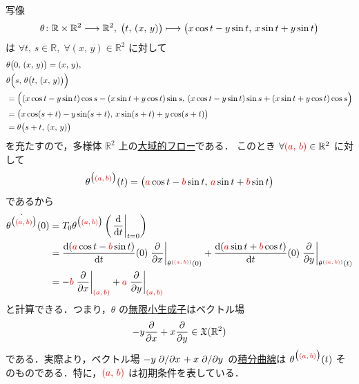 \documentclass[TQFT_main]{subfiles}
\begin{document}
\begin{myexample}[]{}
    \cinfty 写像
    \begin{align}
        \theta \colon \mathbb{R} \times \mathbb{R}^2 \longrightarrow \mathbb{R}^2,\; \bigl( t,\, (x,\, y) \bigr) \longmapsto \bigl( x \cos t - y \sin t,\, x \sin t + y \sin t \bigr) 
    \end{align}
    は $\forall t,\, s \in \mathbb{R},\; \forall (x,\, y) \in \mathbb{R}^2$ に対して 
    \begin{align}
        &\theta \bigl( 0,\, (x,\, y) \bigr) = (x,\, y), \\ 
        &\theta \Bigl( s,\, \theta \bigl( t,\, (x,\, y) \bigr)  \Bigr) \\
        &= \Bigl( (x \cos t - y \sin t) \cos s - (x \sin t + y \cos t) \sin s,\, (x \cos t - y\sin t) \sin s + (x \sin t + y \cos t) \cos s \Bigr) \\
        &= \bigl( x \cos (s + t) - y \sin (s + t),\, x \sin (s + t) +  y \cos (s + t) \bigr) \\
        &= \theta \bigl( s + t,\, (x,\, y) \bigr)
    \end{align}
    を充たすので，多様体 $\mathbb{R}^2$ 上の\hyperref[def:global-flow]{大域的フロー}である．
    このとき $\forall \textcolor{red}{(a,\, b)} \in \mathbb{R}^2$ に対して
    \begin{align}
        \theta^{\bigl(\textcolor{red}{(a,\, b)}\bigr)} (t) = \bigl( \textcolor{red}{a} \cos t - \textcolor{red}{b} \sin t,\, \textcolor{red}{a} \sin t + \textcolor{red}{b} \sin t \bigr) 
    \end{align}
    であるから
    \begin{align}
        \dot{\theta^{\bigl(\textcolor{red}{(a,\, b)}\bigr)}} (0) 
        &= T_0 \theta^{\bigl(\textcolor{red}{(a,\, b)}\bigr)}  \left( \eval{\dv{}{t}}_{t=0} \right) \\
        &= \dv{(\textcolor{red}{a} \cos t - \textcolor{red}{b} \sin t)}{t}()(0) \eval{\pdv{}{x}}_{\theta^{(\textcolor{red}{(a,\, b)})} (0)} + \dv{(\textcolor{red}{a} \sin t + \textcolor{red}{b} \cos t)}{t}()(0) \eval{\pdv{}{y}}_{\theta^{(\textcolor{red}{(a,\, b)})} (t)} \\
        &= - \textcolor{red}{b} \eval{\pdv{}{x}}_{\textcolor{red}{(a,\, b)}} + \textcolor{red}{a} \eval{\pdv{}{y}}_{\textcolor{red}{(a,\, b)}}
    \end{align}
    と計算できる．つまり，$\theta$ の\hyperref[prop:infinitesimal-generator]{無限小生成子}はベクトル場
    \begin{align}
        -y \pdv{}{x} + x \pdv{}{y} \in \mathfrak{X}(\mathbb{R}^2)
    \end{align}
    である．実際より，ベクトル場 $-y \pdv*{}{x} + x \pdv*{}{y}$ の\hyperref[def:integral-curve]{積分曲線}は $\theta^{\bigl(\textcolor{red}{(a,\, b)}\bigr)} (t)$ そのものである．特に，$\textcolor{red}{(a,\, b)}$ は初期条件を表している．
\end{myexample}
\end{document}
